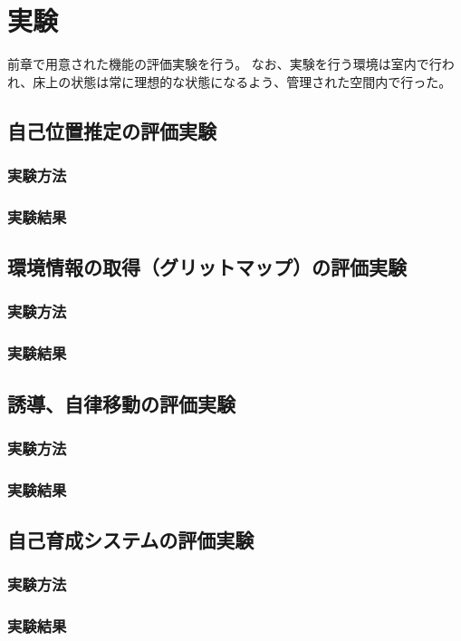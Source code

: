 \chapter{実験}
前章で用意された機能の評価実験を行う。
なお、実験を行う環境は室内で行われ、床上の状態は常に理想的な状態になるよう、管理された空間内で行った。

\section{自己位置推定の評価実験}
\subsection{実験方法}

\subsection{実験結果}
\section{環境情報の取得（グリットマップ）の評価実験}
\subsection{実験方法}
\subsection{実験結果}
\section{誘導、自律移動の評価実験}
\subsection{実験方法}
\subsection{実験結果}
\section{自己育成システムの評価実験}
\subsection{実験方法}
\subsection{実験結果}
